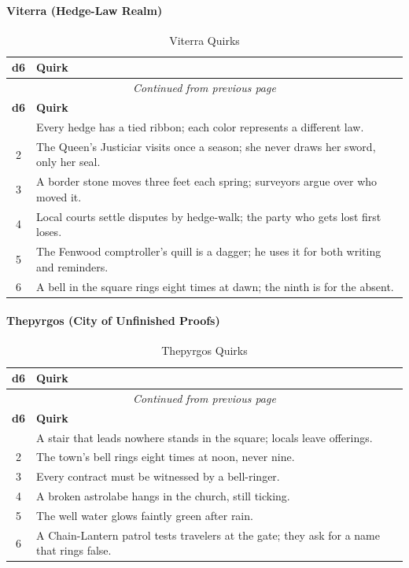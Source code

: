 \paragraph{Viterra (Hedge-Law Realm)}
\begin{center}
\begin{longtable}{cl}
\caption{Viterra Quirks}\\
\toprule
\textbf{d6} & \textbf{Quirk} \\
\midrule
\endfirsthead
\multicolumn{2}{c}{\emph{Continued from previous page}} \\
\toprule
\textbf{d6} & \textbf{Quirk} \\
\midrule
\endhead
\bottomrule
\endfoot
1 & Every hedge has a tied ribbon; each color represents a different law. \\
2 & The Queen's Justiciar visits once a season; she never draws her sword, only her seal. \\
3 & A border stone moves three feet each spring; surveyors argue over who moved it. \\
4 & Local courts settle disputes by hedge-walk; the party who gets lost first loses. \\
5 & The Fenwood comptroller's quill is a dagger; he uses it for both writing and reminders. \\
6 & A bell in the square rings eight times at dawn; the ninth is for the absent. \\
\end{longtable}
\end{center}

\paragraph{Thepyrgos (City of Unfinished Proofs)}
\begin{center}
\begin{longtable}{cl}
\caption{Thepyrgos Quirks}\\
\toprule
\textbf{d6} & \textbf{Quirk} \\
\midrule
\endfirsthead
\multicolumn{2}{c}{\emph{Continued from previous page}} \\
\toprule
\textbf{d6} & \textbf{Quirk} \\
\midrule
\endhead
\bottomrule
\endfoot
1 & A stair that leads nowhere stands in the square; locals leave offerings. \\
2 & The town's bell rings eight times at noon, never nine. \\
3 & Every contract must be witnessed by a bell-ringer. \\
4 & A broken astrolabe hangs in the church, still ticking. \\
5 & The well water glows faintly green after rain. \\
6 & A Chain-Lantern patrol tests travelers at the gate; they ask for a name that rings false. \\
\end{longtable}
\end{center}


